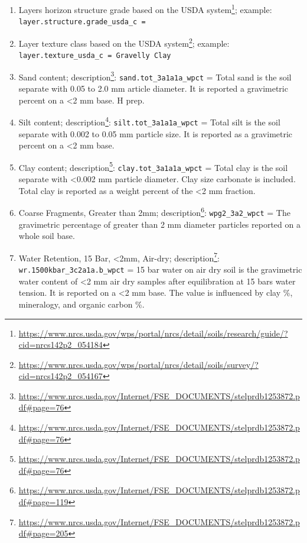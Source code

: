\documentclass[
  graybox,natbib,nospthms]{svmono}
\renewcommand{\href}[2]{#2 (\url{#1})}
\renewcommand{\href}[2]{#2\footnote{\url{#1}}}
\begin{document}
\begin{enumerate}
\item
  Layers horizon structure grade \href{https://www.nrcs.usda.gov/wps/portal/nrcs/detail/soils/research/guide/?cid=nrcs142p2_054184}{based on the USDA system}; example: \texttt{layer.structure.grade\_usda\_c\ =\ \textquotesingle{}\textquotesingle{}}\\
\item
  Layer texture class \href{https://www.nrcs.usda.gov/wps/portal/nrcs/detail/soils/survey/?cid=nrcs142p2_054167}{based on the USDA system}; example: \texttt{layer.texture\_usda\_c\ =\ \textquotesingle{}Gravelly\ Clay\textquotesingle{}}\\
\item
  Sand content; \href{https://www.nrcs.usda.gov/Internet/FSE_DOCUMENTS/stelprdb1253872.pdf\#page=76}{description}: \texttt{sand.tot\_3a1a1a\_wpct} = Total sand is the soil separate with 0.05 to 2.0 mm article diameter. It is reported a gravimetric percent on a \textless2 mm base. H prep.\\
\item
  Silt content; \href{https://www.nrcs.usda.gov/Internet/FSE_DOCUMENTS/stelprdb1253872.pdf\#page=76}{description}: \texttt{silt.tot\_3a1a1a\_wpct} = Total silt is the soil separate with 0.002 to 0.05 mm particle size. It is reported as a gravimetric percent on a \textless2 mm base.\\
\item
  Clay content; \href{https://www.nrcs.usda.gov/Internet/FSE_DOCUMENTS/stelprdb1253872.pdf\#page=76}{description}: \texttt{clay.tot\_3a1a1a\_wpct} = Total clay is the soil separate with \textless0.002 mm particle diameter. Clay size carbonate is included. Total clay is reported as a weight percent of the \textless2 mm fraction.\\
\item
  Coarse Fragments, Greater than 2mm; \href{https://www.nrcs.usda.gov/Internet/FSE_DOCUMENTS/stelprdb1253872.pdf\#page=119}{description}: \texttt{wpg2\_3a2\_wpct} = The gravimetric percentage of greater than 2 mm diameter particles reported on a whole soil base.\\
\item
  Water Retention, 15 Bar, \textless2mm, Air-dry; \href{https://www.nrcs.usda.gov/Internet/FSE_DOCUMENTS/stelprdb1253872.pdf\#page=205}{description}: \texttt{wr.1500kbar\_3c2a1a.b\_wpct} = 15 bar water on air dry soil is the gravimetric water content of \textless2 mm air dry samples after equilibration at 15 bars water tension. It is reported on a \textless2 mm base. The value is influenced by clay \%, mineralogy, and organic carbon \%.\\

\end{enumerate}
\end{document}
